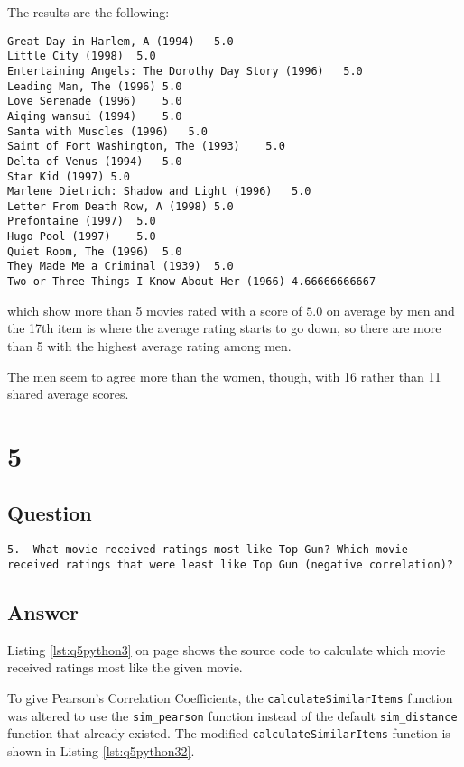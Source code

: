 \documentclass[letterpaper,11pt]{article}
\begin{document}
The results are the following:
\begin{lstlisting}[frame=single]
Great Day in Harlem, A (1994)	5.0
Little City (1998)	5.0
Entertaining Angels: The Dorothy Day Story (1996)	5.0
Leading Man, The (1996)	5.0
Love Serenade (1996)	5.0
Aiqing wansui (1994)	5.0
Santa with Muscles (1996)	5.0
Saint of Fort Washington, The (1993)	5.0
Delta of Venus (1994)	5.0
Star Kid (1997)	5.0
Marlene Dietrich: Shadow and Light (1996) 	5.0
Letter From Death Row, A (1998)	5.0
Prefontaine (1997)	5.0
Hugo Pool (1997)	5.0
Quiet Room, The (1996)	5.0
They Made Me a Criminal (1939)	5.0
Two or Three Things I Know About Her (1966)	4.66666666667
\end{lstlisting}
which show more than 5 movies rated with a score of $5.0$  on average by men and the 17th item is where the average rating starts to go down, so there are more than 5 with the highest average rating among men.

The men seem to agree more than the women, though, with 16 rather than 11 shared average scores.

\newpage

\section*{5}

\subsection*{Question}

\begin{verbatim}
5.  What movie received ratings most like Top Gun? Which movie
received ratings that were least like Top Gun (negative correlation)?
\end{verbatim}

\subsection*{Answer}

Listing \ref{lst:q5python3} on page \pageref{lst:q5python3} shows the source code to calculate which movie received ratings most like the given movie.

To give Pearson's Correlation Coefficients, the \verb+calculateSimilarItems+ function was altered to use the \verb+sim_pearson+ function instead of the default \verb+sim_distance+ function that already existed.  The modified \verb+calculateSimilarItems+ function is shown in Listing \ref{lst:q5python32}.
\end{document}
